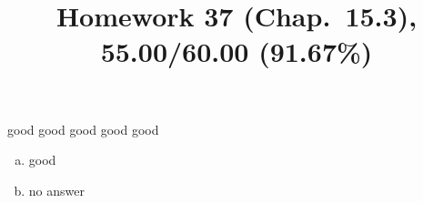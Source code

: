 \documentclass[pstricks,10pt,dvipsnames]{article} %
\title{Homework 37 (Chap.~15.3),
55.00/60.00 (91.67\%)
}
\begin{document}
\maketitle
{}
good
good
good
good
good
\begin{enumerate}[(a)]
    \item good
    \item no answer
\end{enumerate}
\end{document}
